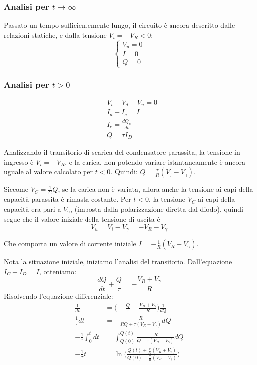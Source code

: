 \documentclass[../elettronica]{subfiles}
\begin{document}
\subsubsection{Analisi per $t \to \infty$}
Passato un tempo sufficientemente lungo, il circuito è ancora descritto dalle relazioni statiche,
e dalla tensione $V_i = -V_R < 0$:
\[\begin{cases}
    V_u = 0
    \\
    I = 0
    \\
    Q = 0
\end{cases}\]

\subsubsection{Analisi per $t > 0$}
\begin{tcolorbox}[title=Equazioni generali]
    \begin{align*}
        &V_i - V_d - V_u = 0\\
        &I_d + I_c = I\\
        &I_c = \frac{dQ_u}{dt}\\
        &Q = \tau I_D
    \end{align*}
\end{tcolorbox}
Analizzando il transitorio di scarica del condensatore parassita, la tensione in ingresso è $V_i = -V_R$, e la
carica, non potendo variare istantaneamente è ancora uguale al valore calcolato per $t < 0$. Quindi: $Q = \frac{\tau}{R}(V_f - V_\gamma)$.

Siccome $V_C = \frac{1}{C} Q$, se la carica non è variata, allora anche la tensione ai capi della capacità parassita è rimasta
costante.
Per $t < 0$, la tensione $V_C$ ai capi della capacità era pari a $V_\gamma$, (imposta dalla polarizzazione diretta dal diodo),
quindi segue che il valore iniziale della tensione di uscita è
$$V_u = V_i - V_\gamma = -V_R - V_\gamma$$

Che comporta un valore di corrente iniziale $I = -\frac{1}{R}(V_R + V_\gamma)$.

Nota la situazione iniziale, iniziamo l'analisi del transitorio. Dall'equazione $I_C + I_D = I$, otteniamo:
$$
    \frac{dQ}{dt} + \frac{Q}{\tau} = -\frac{V_R + V_\gamma}{R}
$$
Risolvendo l'equazione differenziale:
\begin{align}
    \frac{1}{dt} &= \big(-\frac{Q}{\tau} - \frac{V_R + V_\gamma}{R}\big)\frac{1}{dQ}
    \\
    \frac{1}{\tau} dt &= -\frac{R}{RQ + \tau (V_R + V_\gamma)} dQ
    \\
    -\frac{1}{\tau}\int_0^t{dt} &= \int_{Q(0)}^{Q(t)}{\frac{R}{Q + \tau (V_R + V_\gamma)} dQ}
    \\
    -\frac{1}{\tau} t &= \ln\Big(\frac{Q(t) + \frac{\tau}{R}(V_R + V_\gamma)}{Q(0) + \frac{\tau}{R}(V_R + V_\gamma)}\Big)
\end{align}
\end{document}

